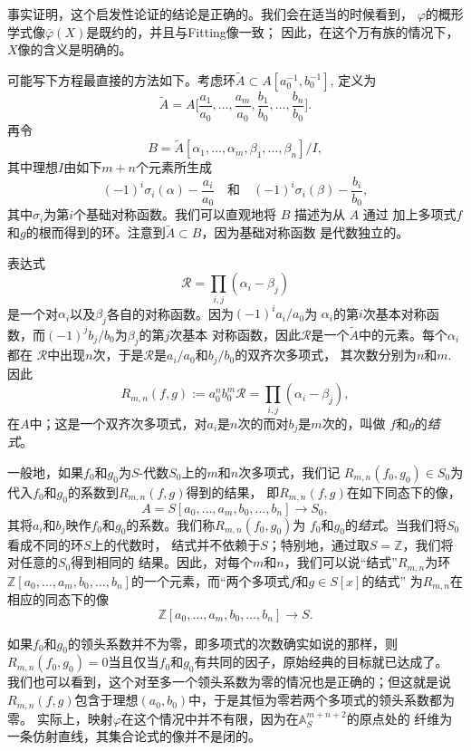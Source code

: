 事实证明，这个启发性论证的结论是正确的。我们会在适当的时候看到，
$\varphi$的概形学式像$\bar\varphi(X)$是既约的，并且与Fitting像一致；
因此，在这个万有族的情况下，$X$像的含义是明确的。

可能写下方程最直接的方法如下。考虑环$\tilde A\subset A[a_0^{-1},b_0^{-1}]$,
定义为
\[
    \tilde A=A\biggl[
        \frac{a_1}{a_0},\dots,\frac{a_m}{a_0},
        \frac{b_1}{b_0},\dots,\frac{b_n}{b_0}
    \biggr].
\]
再令
\[
    B=\tilde A[\alpha_1,\dots,\alpha_m,\beta_1,\dots,\beta_n]/I,
\]
其中理想$I$由如下$m+n$个元素所生成
\[
    (-1)^i\sigma_i(\alpha)-\frac{a_i}{a_0}
    \quad \text{和}\quad 
    (-1)^i\sigma_i(\beta)-\frac{b_i}{b_0},
\]
其中$\sigma_i$为第$i$个基础对称函数。我们可以直观地将 $B$ 描述为从 $A$ 通过
加上多项式$f$和$g$的根而得到的环。注意到$\tilde A\subset B$，因为基础对称函数
是代数独立的。

表达式
\[
    \mathscr R=\prod_{i,j}(\alpha_i-\beta_j)
\]
是一个对$\alpha_i$以及$\beta_j$各自的对称函数。因为$(-1)^ia_i/a_0$为
$\alpha_i$的第$i$次基本对称函数，而$(-1)^jb_j/b_0$为$\beta_j$的第$j$次基本
对称函数，因此$\mathscr R$是一个$\tilde A$中的元素。每个$\alpha_i$都在
$\mathscr R$中出现$n$次，于是$\mathscr R$是$a_i/a_0$和$b_j/b_0$的双齐次多项式，
其次数分别为$n$和$m$. 因此
\[
    R_{m,n}(f,g):=a_0^nb_0^m \mathscr R=\prod_{i,j}(\alpha_i-\beta_j),
\]
在$A$中；这是一个双齐次多项式，对$a_i$是$n$次的而对$b_j$是$m$次的，叫做
$f$和$g$的\textit{结式}。


一般地，如果$f_0$和$g_0$为$S$-代数$S_0$上的$m$和$n$次多项式，我们记
$R_{m,n}(f_0,g_0)\in S_0$为代入$f_0$和$g_0$的系数到$R_{m,n}(f,g)$得到的结果，
即$R_{m,n}(f,g)$在如下同态下的像，
\[
    A=S[a_0, \ldots, a_m, b_0, \ldots, b_n] \to S_0,
\]
其将$a_i$和$b_j$映作$f_0$和$g_0$的系数。我们称$R_{m,n}(f_0,g_0)$为
$f_0$和$g_0$的\textit{结式}。当我们将$S_0$看成不同的环$S$上的代数时，
结式并不依赖于$S$；特别地，通过取$S=\mathbb Z$，我们将对任意的$S_0$得到相同的
结果。因此，对每个$m$和$n$，我们可以说“结式”$R_{m,n}$为环$\mathbb Z
[a_0,\dots,a_m,b_0,\dots,b_n]$的一个元素，而“两个多项式$f$和$g\in S[x]$的结式”
为$R_{m,n}$在相应的同态下的像
\[
    \mathbb{Z}[a_0, \ldots, a_m, b_0, \ldots, b_n] \to S.
\]

如果$f_0$和$g_0$的领头系数并不为零，即多项式的次数确实如说的那样，则
$R_{m,n}(f_0,g_0)=0$当且仅当$f_0$和$g_0$有共同的因子，原始经典的目标就已达成了。
我们也可以看到，这个对至多一个领头系数为零的情况也是正确的；但这就是说
$R_{m,n}(f,g)$包含于理想$(a_0,b_0)$中，于是其恒为零若两个多项式的领头系数都为零。
实际上，映射$\varphi$在这个情况中并不有限，因为在$\mathbb A_S^{m+n+2}$的原点处的
纤维为一条仿射直线，其集合论式的像并不是闭的。

